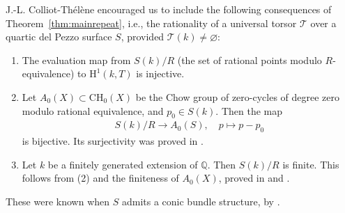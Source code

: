 \documentclass[12pt, reqno]{amsart}
\theoremstyle{plain}
\theoremstyle{remark}
\theoremstyle{definition}
\numberwithin{equation}{section}
\def\cT{{\mathcal T}}
\def\bQ{{\mathbb Q}}
\def\rH{{\mathrm H}}
\begin{document}
J.-L. Colliot-Th\'el\`ene encouraged us to include the following consequences of Theorem~\ref{thm:mainrepeat}, i.e., the rationality of a universal torsor $\cT$ over a quartic del Pezzo surface $S$, provided $\cT(k)\neq \varnothing$:
\begin{enumerate}
    \item The evaluation map from $S(k)/R$ (the set of rational points modulo $R$-equivalence) to $\rH^1(k,T)$ is injective. 
 \item Let $A_{0}(X) \subset \mathrm{CH}_{0}(X)$ be the Chow group of zero-cycles of
degree zero modulo rational equivalence, and $p_0\in S(k)$.
  Then the map  
  \begin{align*}
      S(k)/R \to  A_{0}(S),\quad p\mapsto p-p_0
  \end{align*}
is bijective. 
Its surjectivity was proved in \cite{CTCoray}. 
\item Let $k$ be a finitely generated extension of $\bQ$. Then $S(k)/R$ is finite. This follows from (2) and the finiteness of $A_0(X)$, proved in \cite{CTchow} and \cite{Bloch}. 
\end{enumerate}
These were known when $S$ admits a conic bundle structure, by \cite{CTSkdP4R}.
\end{document}
